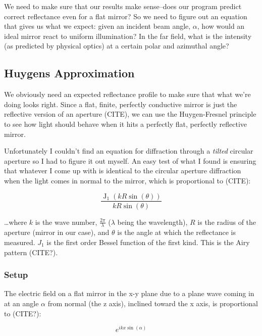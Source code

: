 \documentclass[etd,oneside,senior]{BYUPhys}
\DeclareMathOperator{\J}{J}
\begin{document}
We need to make sure that our results make sense--does our program predict correct reflectance even for a flat mirror? So we need to figure out an equation that gives us what we expect: given an incident beam angle, $\alpha$, how would an ideal mirror react to uniform illumination? In the far field, what is the intensity (as predicted by physical optics) at a certain polar and azimuthal angle?

\subsection{Huygens Approximation} \label{subsec:huygens_approx}

We obviously need an expected reflectance profile to make sure that what we're doing looks right. Since a flat, finite, perfectly conductive mirror is just the reflective version of an aperture (CITE), we can use the Huygen-Fresnel principle to see how light should behave when it hits a perfectly flat, perfectly reflective mirror.

Unfortunately I couldn't find an equation for diffraction through a \textit{tilted} circular aperture so I had to figure it out myself. An easy test of what I found is ensuring that whatever I come up with is identical to the circular aperture diffraction when the light comes in normal to the mirror, which is proportional to (CITE):

\begin{equation}\label{eq:airy}
  \frac{\J_1(kR\sin(\theta))}{kR\sin(\theta)}
\end{equation}

\ldots where $k$ is the wave number, $\frac{2\pi}{\lambda}$ ($\lambda$ being the wavelength), $R$ is the radius of the aperture (mirror in our case), and $\theta$ is the angle at which the reflectance is measured. $J_1$ is the first order Bessel function of the first kind. This is the Airy pattern (CITE?).

\subsubsection{Setup}

The electric field on a flat mirror in the x-y plane due to a plane wave coming in at an angle $\alpha$ from normal (the z axis), inclined toward the x axis, is proportional to (CITE?):

\begin{equation}
  e^{ikx\sin\left({\alpha}\right)}
\end{equation}
\end{document}

